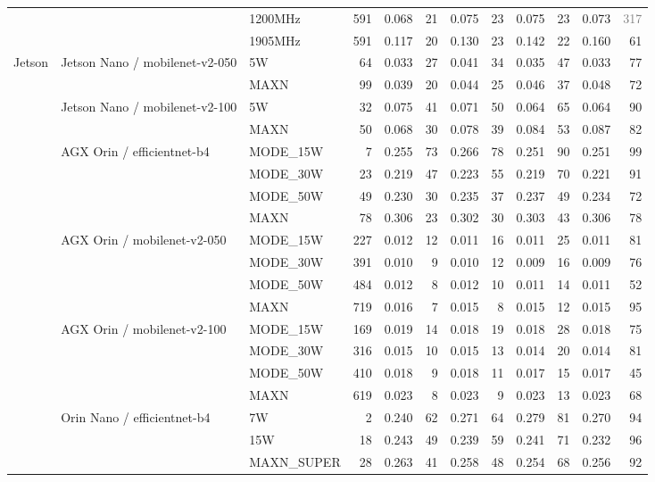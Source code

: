 \documentclass[10pt]{article}
\begin{document}
\begin{center}
\begin{longtable}{@{}lll r *{4}{r r}@{}}
 &  & 1200MHz & 591 & 0.068 & 21 & 0.075 & 23 & 0.075 & 23 & 0.073 & \textcolor{gray}{317} \\
 &  & 1905MHz & 591 & 0.117 & 20 & 0.130 & 23 & 0.142 & 22 & 0.160 & 61 \\
\addlinespace[2pt]
Jetson & Jetson Nano / mobilenet-v2-050 & 5W & 64 & 0.033 & 27 & 0.041 & 34 & 0.035 & 47 & 0.033 & 77 \\
 &  & MAXN & 99 & 0.039 & 20 & 0.044 & 25 & 0.046 & 37 & 0.048 & 72 \\
\addlinespace[2pt]
 & Jetson Nano / mobilenet-v2-100 & 5W & 32 & 0.075 & 41 & 0.071 & 50 & 0.064 & 65 & 0.064 & 90 \\
 &  & MAXN & 50 & 0.068 & 30 & 0.078 & 39 & 0.084 & 53 & 0.087 & 82 \\
\addlinespace[2pt]
 & AGX Orin / efficientnet-b4 & MODE\_15W & 7 & 0.255 & 73 & 0.266 & 78 & 0.251 & 90 & 0.251 & 99 \\
 &  & MODE\_30W & 23 & 0.219 & 47 & 0.223 & 55 & 0.219 & 70 & 0.221 & 91 \\
 &  & MODE\_50W & 49 & 0.230 & 30 & 0.235 & 37 & 0.237 & 49 & 0.234 & 72 \\
 &  & MAXN & 78 & 0.306 & 23 & 0.302 & 30 & 0.303 & 43 & 0.306 & 78 \\
\addlinespace[2pt]
 & AGX Orin / mobilenet-v2-050 & MODE\_15W & 227 & 0.012 & 12 & 0.011 & 16 & 0.011 & 25 & 0.011 & 81 \\
 &  & MODE\_30W & 391 & 0.010 & 9 & 0.010 & 12 & 0.009 & 16 & 0.009 & 76 \\
 &  & MODE\_50W & 484 & 0.012 & 8 & 0.012 & 10 & 0.011 & 14 & 0.011 & 52 \\
 &  & MAXN & 719 & 0.016 & 7 & 0.015 & 8 & 0.015 & 12 & 0.015 & 95 \\
\addlinespace[2pt]
 & AGX Orin / mobilenet-v2-100 & MODE\_15W & 169 & 0.019 & 14 & 0.018 & 19 & 0.018 & 28 & 0.018 & 75 \\
 &  & MODE\_30W & 316 & 0.015 & 10 & 0.015 & 13 & 0.014 & 20 & 0.014 & 81 \\
 &  & MODE\_50W & 410 & 0.018 & 9 & 0.018 & 11 & 0.017 & 15 & 0.017 & 45 \\
 &  & MAXN & 619 & 0.023 & 8 & 0.023 & 9 & 0.023 & 13 & 0.023 & 68 \\
\addlinespace[2pt]
 & Orin Nano / efficientnet-b4 & 7W & 2 & 0.240 & 62 & 0.271 & 64 & 0.279 & 81 & 0.270 & 94 \\
 &  & 15W & 18 & 0.243 & 49 & 0.239 & 59 & 0.241 & 71 & 0.232 & 96 \\
 &  & MAXN\_SUPER & 28 & 0.263 & 41 & 0.258 & 48 & 0.254 & 68 & 0.256 & 92 \\

\end{longtable}
\end{center}
\end{document}
